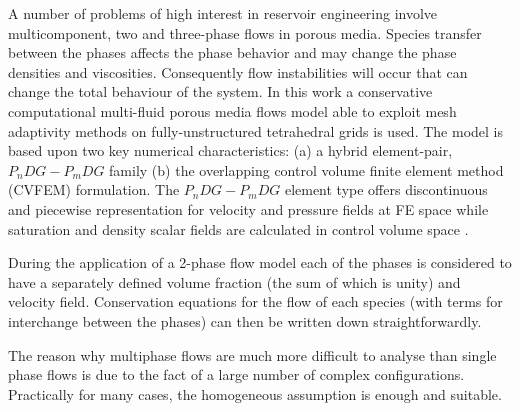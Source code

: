 \documentclass[12pt,a4paper,oneside]{report}%
\begin{document}
A number of problems of high interest in reservoir engineering involve multicomponent, two and three-phase flows in porous media. Species transfer between the phases affects the phase behavior and may change the phase densities and viscosities. Consequently flow instabilities will occur that can change the total behaviour of the system. In this work a conservative computational multi-fluid porous media flows model able to exploit mesh adaptivity methods on fully-unstructured tetrahedral grids is used. The model is based upon two key numerical characteristics: (a) a hybrid element-pair, \textit{$P_{n}DG-P_{m}DG$} family (b) the overlapping control volume finite element method (CVFEM) formulation. The $P_{n}DG-P_{m}DG$ element type offers discontinuous and piecewise representation for velocity and pressure fields at FE space while saturation and density scalar fields are calculated in control volume space \cite{Peksa2015237}. 

During the application of a 2-phase flow model each of the phases is considered to have a separately defined volume fraction (the sum of which is unity) and velocity field. Conservation equations for the flow of each species (with terms for interchange between the phases) can then be written down straightforwardly.

The reason why multiphase flows are much more difficult to analyse than single phase flows is due to the fact of a large number of complex configurations. Practically for many cases, the homogeneous assumption is enough and suitable.


\end{document}
